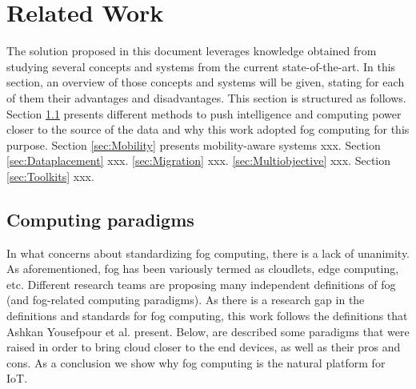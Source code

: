 \vfill
\pagebreak
\section{Related Work}
\label{sec:RelatedWork}

The solution proposed in this document leverages knowledge obtained from studying several concepts and systems from the current state-of-the-art. In this section, an overview of those concepts and systems will be given, stating for each of them their advantages and disadvantages. This section is structured as follows. Section \ref{sec:Computingparadigms} presents different methods to push intelligence and computing power closer to the source of the data and why this work adopted fog computing for this purpose. Section \ref{sec:Mobility} presents mobility-aware systems xxx. Section \ref{sec:Dataplacement} xxx. \ref{sec:Migration} xxx. \ref{sec:Multiobjective} xxx. Section \ref{sec:Toolkits} xxx.

\subsection{Computing paradigms}
\label{sec:Computingparadigms}
In what concerns about standardizing fog computing, there is a lack of unanimity. As aforementioned, fog has been variously termed as cloudlets, edge computing, etc. Different research teams are proposing many independent definitions of fog (and fog-related computing paradigms). As there is a research gap in the definitions and standards for fog computing, this work follows the definitions that Ashkan Yousefpour et al. \cite{yousefpour2018all} present. Below, are described some paradigms that were raised in order to bring cloud closer to the end devices, as well as their pros and cons. As a conclusion we show why fog computing is the natural platform for IoT.

